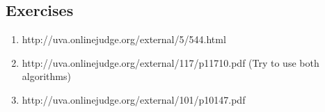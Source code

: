 \subsection{Exercises}

\begin{enumerate}
\item http://uva.onlinejudge.org/external/5/544.html
\item http://uva.onlinejudge.org/external/117/p11710.pdf (Try to use both algorithms)
\item http://uva.onlinejudge.org/external/101/p10147.pdf
\end{enumerate}